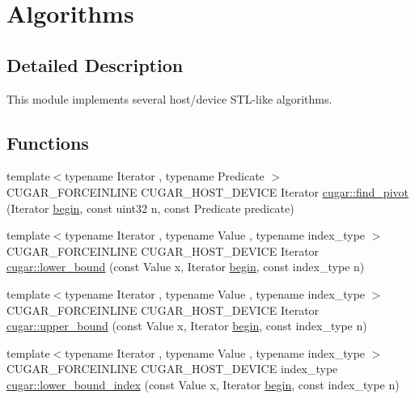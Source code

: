 \hypertarget{group___algorithms_module}{}\section{Algorithms}
\label{group___algorithms_module}


\subsection{Detailed Description}
This module implements several host/device S\+T\+L-\/like algorithms. \subsection*{Functions}
\begin{DoxyCompactItemize}
\item 
{\footnotesize template$<$typename Iterator , typename Predicate $>$ }\\C\+U\+G\+A\+R\+\_\+\+F\+O\+R\+C\+E\+I\+N\+L\+I\+NE C\+U\+G\+A\+R\+\_\+\+H\+O\+S\+T\+\_\+\+D\+E\+V\+I\+CE Iterator \hyperlink{group___algorithms_module_gaf5c0f35d93fa8af4939155b21c7e2a4f}{cugar\+::find\+\_\+pivot} (Iterator \hyperlink{namespacecugar_a2121df08f967e232ea5fe0ee378dee67}{begin}, const uint32 n, const Predicate predicate)
\item 
{\footnotesize template$<$typename Iterator , typename Value , typename index\+\_\+type $>$ }\\C\+U\+G\+A\+R\+\_\+\+F\+O\+R\+C\+E\+I\+N\+L\+I\+NE C\+U\+G\+A\+R\+\_\+\+H\+O\+S\+T\+\_\+\+D\+E\+V\+I\+CE Iterator \hyperlink{group___algorithms_module_gab5ce2c7f834a31bc40d9101865dec5d1}{cugar\+::lower\+\_\+bound} (const Value x, Iterator \hyperlink{namespacecugar_a2121df08f967e232ea5fe0ee378dee67}{begin}, const index\+\_\+type n)
\item 
{\footnotesize template$<$typename Iterator , typename Value , typename index\+\_\+type $>$ }\\C\+U\+G\+A\+R\+\_\+\+F\+O\+R\+C\+E\+I\+N\+L\+I\+NE C\+U\+G\+A\+R\+\_\+\+H\+O\+S\+T\+\_\+\+D\+E\+V\+I\+CE Iterator \hyperlink{group___algorithms_module_gafe7ee3a93350b3d2f7f7bb6266ee0425}{cugar\+::upper\+\_\+bound} (const Value x, Iterator \hyperlink{namespacecugar_a2121df08f967e232ea5fe0ee378dee67}{begin}, const index\+\_\+type n)
\item 
{\footnotesize template$<$typename Iterator , typename Value , typename index\+\_\+type $>$ }\\C\+U\+G\+A\+R\+\_\+\+F\+O\+R\+C\+E\+I\+N\+L\+I\+NE C\+U\+G\+A\+R\+\_\+\+H\+O\+S\+T\+\_\+\+D\+E\+V\+I\+CE index\+\_\+type \hyperlink{group___algorithms_module_ga43d4b89e44476e26c04a89f975e4a21e}{cugar\+::lower\+\_\+bound\+\_\+index} (const Value x, Iterator \hyperlink{namespacecugar_a2121df08f967e232ea5fe0ee378dee67}{begin}, const index\+\_\+type n)

\end{DoxyCompactItemize}
